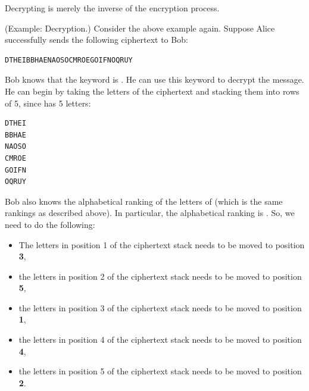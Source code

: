\documentclass[letterpaper]{article}
\newcommand{\0}{\mathbf{0}}
\begin{document}
Decrypting is merely the inverse of the encryption process.
\begin{mdframed}
    (Example: Decryption.) Consider the above example again. Suppose Alice successfully sends the following ciphertext to Bob:
    \begin{mdframed}
        \begin{verbatim}
DTHEIBBHAENAOSOCMROEGOIFNOQRUY\end{verbatim}
    \end{mdframed}
    Bob knows that the keyword is . He can use this keyword to decrypt the message. He can begin by taking the letters of the ciphertext and stacking them into rows of 5, since  has 5 letters:
    \begin{mdframed}
        \begin{verbatim}
DTHEI
BBHAE
NAOSO
CMROE
GOIFN
OQRUY\end{verbatim}
    \end{mdframed}
    Bob also knows the alphabetical ranking of the letters of  (which is the same rankings as described above). In particular, the alphabetical ranking is . So, we need to do the following: 
    \begin{itemize}
        \item The letters in position 1 of the ciphertext stack needs to be moved to position \textbf{3},
        \item the letters in position 2 of the ciphertext stack needs to be moved to position \textbf{5},
        \item the letters in position 3 of the ciphertext stack needs to be moved to position \textbf{1},
        \item the letters in position 4 of the ciphertext stack needs to be moved to position \textbf{4},
        \item the letters in position 5 of the ciphertext stack needs to be moved to position \textbf{2}. 
    \end{itemize}
    

\end{mdframed}
\end{document}
